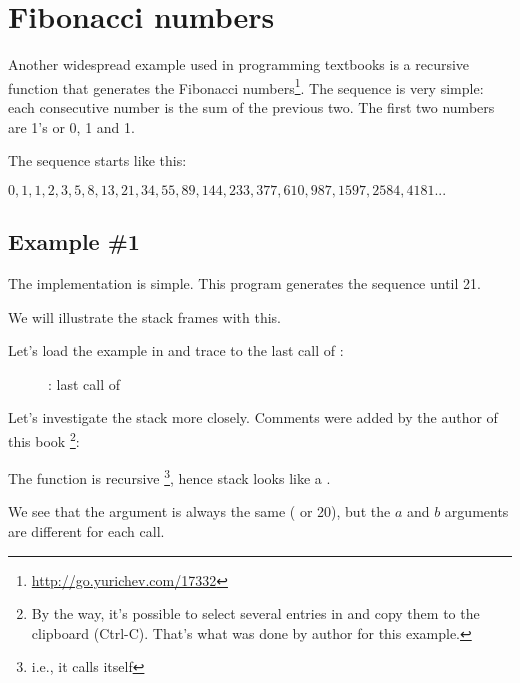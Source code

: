 \section{Fibonacci numbers}

Another widespread example used in programming textbooks is a recursive function 
that generates the Fibonacci numbers\footnote{\url{http://go.yurichev.com/17332}}.
The sequence is very simple: each consecutive number is the sum of the previous two.
The first two numbers are 1's or 0, 1 and 1.

The sequence starts like this:

\begin{center}
$0, 1, 1, 2, 3, 5, 8, 13, 21, 34, 55, 89, 144, 233, 377, 610, 987, 1597, 2584, 4181 ...$
\end{center}

\subsection{Example \#1}

The implementation is simple. This program generates the sequence until 21.





We will illustrate the stack frames with this.

\clearpage

Let's load the example in \olly and trace to the last call of \ttf{}:

\begin{figure}[H]
\centering
{}
\caption{\olly: last call of \ttf{}}
\label{fig:fib_olly}
\end{figure}

\clearpage
Let's investigate the stack more closely. 
Comments were added by the author of this book
\footnote{By the way, it's possible to select several entries in \olly and copy them to the clipboard (Ctrl-C).
That's what was done by author for this example.}:



The function is recursive \footnote{i.e., it calls itself}, hence stack looks like a .

We see that the  argument is always the same ( or 20), but the $a$ and $b$ arguments are different for each call.

